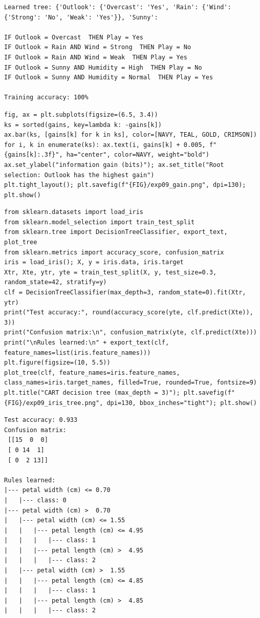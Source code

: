 \documentclass[11pt]{article}
\begin{document}
\begin{lstlisting}[style=out]
Learned tree: {'Outlook': {'Overcast': 'Yes', 'Rain': {'Wind': {'Strong': 'No', 'Weak': 'Yes'}}, 'Sunny':

IF Outlook = Overcast  THEN Play = Yes
IF Outlook = Rain AND Wind = Strong  THEN Play = No
IF Outlook = Rain AND Wind = Weak  THEN Play = Yes
IF Outlook = Sunny AND Humidity = High  THEN Play = No
IF Outlook = Sunny AND Humidity = Normal  THEN Play = Yes

Training accuracy: 100%
\end{lstlisting}
\begin{lstlisting}[style=py]
fig, ax = plt.subplots(figsize=(6.5, 3.4))
ks = sorted(gains, key=lambda k: -gains[k])
ax.bar(ks, [gains[k] for k in ks], color=[NAVY, TEAL, GOLD, CRIMSON])
for i, k in enumerate(ks): ax.text(i, gains[k] + 0.005, f"{gains[k]:.3f}", ha="center", color=NAVY, weight="bold")
ax.set_ylabel("information gain (bits)"); ax.set_title("Root selection: Outlook has the highest gain")
plt.tight_layout(); plt.savefig(f"{FIG}/exp09_gain.png", dpi=130); plt.show()
\end{lstlisting}
\begin{lstlisting}[style=py]
from sklearn.datasets import load_iris
from sklearn.model_selection import train_test_split
from sklearn.tree import DecisionTreeClassifier, export_text, plot_tree
from sklearn.metrics import accuracy_score, confusion_matrix
iris = load_iris(); X, y = iris.data, iris.target
Xtr, Xte, ytr, yte = train_test_split(X, y, test_size=0.3, random_state=42, stratify=y)
clf = DecisionTreeClassifier(max_depth=3, random_state=0).fit(Xtr, ytr)
print("Test accuracy:", round(accuracy_score(yte, clf.predict(Xte)), 3))
print("Confusion matrix:\n", confusion_matrix(yte, clf.predict(Xte)))
print("\nRules learned:\n" + export_text(clf, feature_names=list(iris.feature_names)))
plt.figure(figsize=(10, 5.5))
plot_tree(clf, feature_names=iris.feature_names, class_names=iris.target_names, filled=True, rounded=True, fontsize=9)
plt.title("CART decision tree (max_depth = 3)"); plt.savefig(f"{FIG}/exp09_iris_tree.png", dpi=130, bbox_inches="tight"); plt.show()
\end{lstlisting}
\begin{lstlisting}[style=out]
Test accuracy: 0.933
Confusion matrix:
 [[15  0  0]
 [ 0 14  1]
 [ 0  2 13]]

Rules learned:
|--- petal width (cm) <= 0.70
|   |--- class: 0
|--- petal width (cm) >  0.70
|   |--- petal width (cm) <= 1.55
|   |   |--- petal length (cm) <= 4.95
|   |   |   |--- class: 1
|   |   |--- petal length (cm) >  4.95
|   |   |   |--- class: 2
|   |--- petal width (cm) >  1.55
|   |   |--- petal length (cm) <= 4.85
|   |   |   |--- class: 1
|   |   |--- petal length (cm) >  4.85
|   |   |   |--- class: 2
\end{lstlisting}
\end{document}
